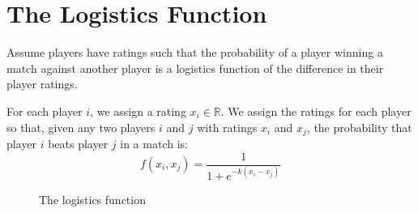 \documentclass{article}
\begin{document}
\section{The Logistics Function}
Assume players have ratings such that the probability of a player winning a
match against another player is a logistics function of the difference in
their player ratings.

For each player $i$, we assign a rating $x_i \in \mathbb{R}$. We assign the
ratings for each player so that, given any two players $i$ and $j$ with
ratings $x_i$ and $x_j$, the probability that player $i$ beats player $j$ in a
match is:
\begin{equation}
  f(x_i, x_j) = \frac{1}{1 + e^{-k(x_i - x_j)}}
\end{equation}

\begin{figure}
  \caption{The logistics function}
  \label{fig:logistics}
 \end{figure}
\end{document}
